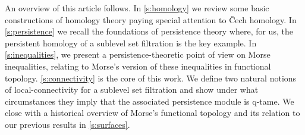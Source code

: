 An overview of this article follows.
In \cref{s:homology} we review some basic constructions of homology theory paying special attention to \v{C}ech homology.
In \cref{s:persistence} we recall the foundations of persistence theory where, for us, the persistent homology of a sublevel set filtration is the key example.
In \cref{s:inequalities}, we present a persistence-theoretic point of view on Morse inequalities, relating to Morse's version of these inequalities in functional topology.
\cref{s:connectivity} is the core of this work.
We define two natural notions of local-connectivity for a sublevel set filtration and show under what circumstances they imply that the associated persistence module is q-tame.
We close with a historical overview of Morse's functional topology and its relation to our previous results in \cref{s:surfaces}.